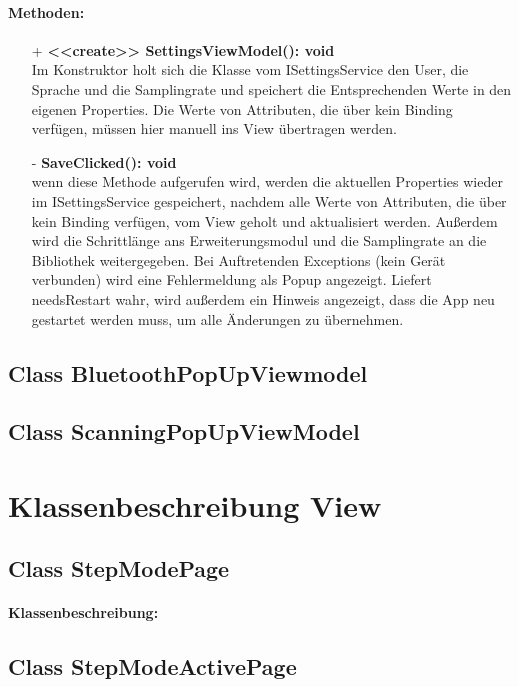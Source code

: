 \documentclass[a4paper,12pt]{article}
\begin{document}
\paragraph{Methoden:}
\begin{itemize}
    \item[+] \textbf{<<create>> SettingsViewModel(): void}\\ Im Konstruktor holt sich die Klasse vom ISettingsService den User, die Sprache und die Samplingrate und speichert die Entsprechenden Werte in den eigenen Properties. Die Werte von Attributen, die über kein Binding verfügen, müssen hier manuell ins View übertragen werden.
    \item[-] \textbf{SaveClicked(): void}\\ wenn diese Methode aufgerufen wird, werden die aktuellen Properties wieder im ISettingsService gespeichert, nachdem alle Werte von Attributen, die über kein Binding verfügen, vom View geholt und aktualisiert werden. Außerdem wird die Schrittlänge ans Erweiterungsmodul und die Samplingrate an die Bibliothek weitergegeben. Bei Auftretenden Exceptions (kein Gerät verbunden) wird eine Fehlermeldung als Popup angezeigt. Liefert needsRestart wahr, wird außerdem ein Hinweis angezeigt, dass die App neu gestartet werden muss, um alle Änderungen zu übernehmen. 
\end{itemize} 

\subsection{Class BluetoothPopUpViewmodel}

\subsection{Class ScanningPopUpViewModel}

\section{Klassenbeschreibung View}
	\subsection{Class StepModePage}
	\paragraph{Klassenbeschreibung:}
	
	\subsection{Class StepModeActivePage}
\end{document}
